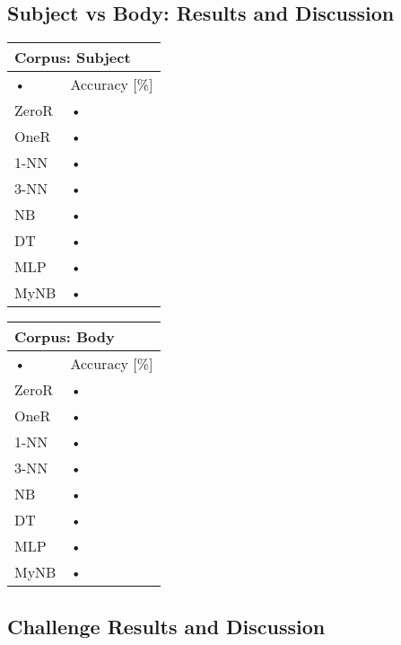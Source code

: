 \documentclass[10pt, a4paper]{article}
\begin{document}
\subsection*{Subject vs Body: Results and Discussion}

\begin{tabular}{|l|l|}
\hline 
\multicolumn{2}{|l|}{Corpus: Subject} \\ 
\hline 
• & Accuracy [\%] \\ 
\hline 
ZeroR & • \\ 
\hline 
OneR & • \\ 
\hline 
1-NN & • \\ 
\hline 
3-NN & • \\ 
\hline 
NB & • \\ 
\hline 
DT & • \\ 
\hline 
MLP & • \\ 
\hline 
MyNB & • \\ 
\hline 
\end{tabular} 

\begin{tabular}{|l|l|}
\hline 
\multicolumn{2}{|l|}{Corpus: Body} \\ 
\hline 
• & Accuracy [\%] \\ 
\hline 
ZeroR & • \\ 
\hline 
OneR & • \\ 
\hline 
1-NN & • \\ 
\hline 
3-NN & • \\ 
\hline 
NB & • \\ 
\hline 
DT & • \\ 
\hline 
MLP & • \\ 
\hline 
MyNB & • \\ 
\hline 
\end{tabular} 


\subsection*{Challenge Results and Discussion}
\end{document}
